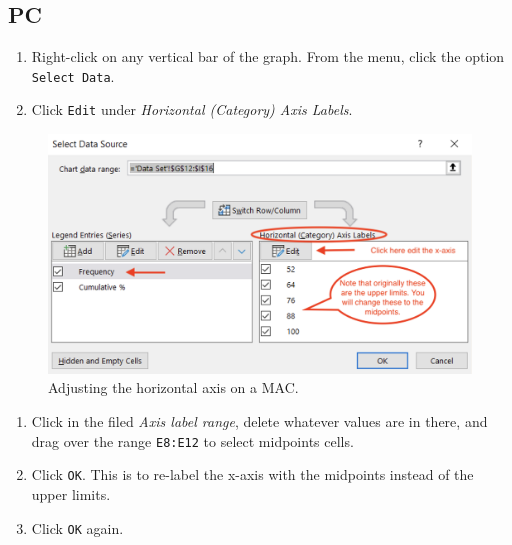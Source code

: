 \documentclass[
]{book}
\providecommand{\tightlist}{%
  \setlength{\itemsep}{0pt}\setlength{\parskip}{0pt}}
\begin{document}
\hypertarget{pc}{%
\subsection{PC}\label{pc}}

\begin{enumerate}
\def\labelenumi{\arabic{enumi}.}
\tightlist
\item
  Right-click on any vertical bar of the graph. From the menu, click the option \texttt{Select\ Data}.
\item
  Click \texttt{Edit} under \emph{Horizontal (Category) Axis Labels}.
\end{enumerate}

\begin{figure}

{\centering \includegraphics[width=0.9\linewidth]{adjusting-horizontal-axis-pc} 

}

\caption{Adjusting the horizontal axis on a MAC.}\label{fig:adjusting-horizontal-axis-pc}
\end{figure}

\begin{enumerate}
\def\labelenumi{\arabic{enumi}.}
\setcounter{enumi}{2}
\tightlist
\item
  Click in the filed \emph{Axis label range}, delete whatever values are in there, and drag over the range \texttt{E8:E12} to select midpoints cells.
\item
  Click \texttt{OK}. This is to re-label the x-axis with the midpoints instead of the upper limits.
\item
  Click \texttt{OK} again.
\end{enumerate}
\end{document}

